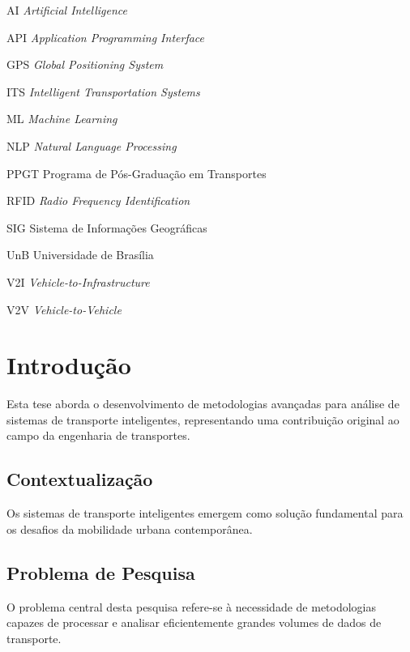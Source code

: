 \documentclass[doutorado,onehalfspacing,12pt,hyperref]{UnB-PPGT}
\begin{document}
\begin{siglas}
\item[AI] \textit{Artificial Intelligence}
\item[API] \textit{Application Programming Interface}
\item[GPS] \textit{Global Positioning System}
\item[ITS] \textit{Intelligent Transportation Systems}
\item[ML] \textit{Machine Learning}
\item[NLP] \textit{Natural Language Processing}
\item[PPGT] Programa de Pós-Graduação em Transportes
\item[RFID] \textit{Radio Frequency Identification}
\item[SIG] Sistema de Informações Geográficas
\item[UnB] Universidade de Brasília
\item[V2I] \textit{Vehicle-to-Infrastructure}
\item[V2V] \textit{Vehicle-to-Vehicle}
\end{siglas}

\textual

\chapter{Introdução}
\label{cap:introducao}

Esta tese aborda o desenvolvimento de metodologias avançadas para análise de sistemas de transporte inteligentes, representando uma contribuição original ao campo da engenharia de transportes.

\section{Contextualização}
\label{sec:contextualizacao}

Os sistemas de transporte inteligentes emergem como solução fundamental para os desafios da mobilidade urbana contemporânea.

\section{Problema de Pesquisa}
\label{sec:problema}

O problema central desta pesquisa refere-se à necessidade de metodologias capazes de processar e analisar eficientemente grandes volumes de dados de transporte.
\end{document}
